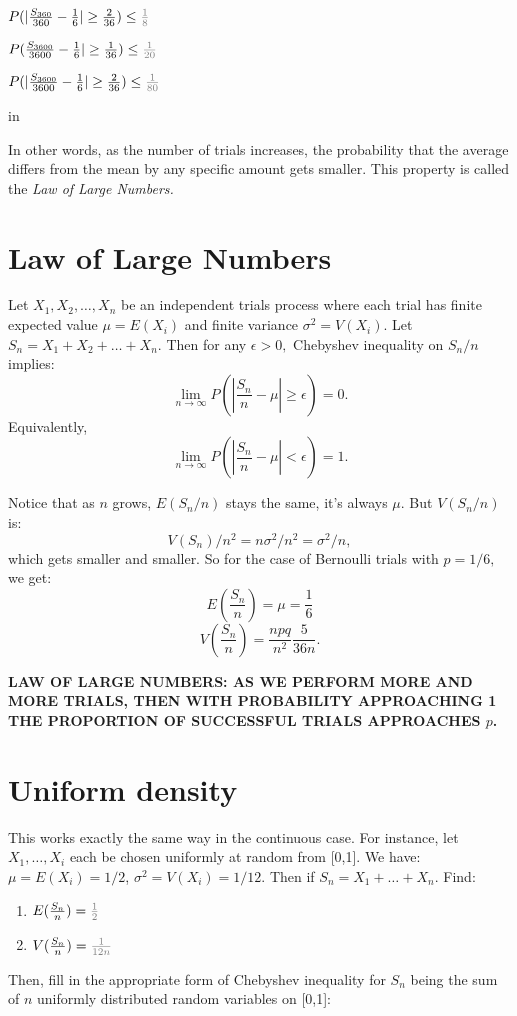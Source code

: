 \documentclass[english]{svjour3modified}
\begin{document}
$P(|\frac{S_{360}}{360}-\frac{1}{6}|\geq \frac{2}{36})\leq \textcolor{black!50}{\frac{1}{8}}$ \bigskip

$P(\frac{S_{3600}}{3600}-\frac{1}{6}|\geq \frac{1}{36})\leq \textcolor{black!50}{\frac{1}{20}}$ \bigskip

$P(|\frac{S_{3600}}{3600}-\frac{1}{6}|\geq \frac{2}{36})\leq \textcolor{black!50}{\frac{1}{80}}$

 in


\normalsize
\noindent In other words, as the number of trials increases, the probability that the average differs from the mean by any specific amount gets smaller. This property is called the \emph{Law of Large Numbers.}

\pagebreak
\section{Law of Large Numbers}

Let $X_1,X_2,\dots,X_n$ be an independent trials process where each trial has finite expected value $\mu=E(X_i)$ and finite variance $\sigma^2=V(X_i).$ Let $S_n=X_1+X_2+\dots+X_n.$ Then for any $\epsilon>0,$ Chebyshev inequality on $S_n/n$ implies: $$\lim_{n\rightarrow\infty}P(|\frac{S_n}{n}-\mu|\geq \epsilon)=0.$$ Equivalently, $$\lim_{n\rightarrow\infty}P(|\frac{S_n}{n}-\mu|< \epsilon)=1.$$

\noindent Notice that as $n$ grows, $E(S_n/n)$ stays the same, it's always $\mu.$ But $V(S_n/n)$ is: $$V(S_n)/n^2=n\sigma^2/n^2=\sigma^2/n,$$ which gets smaller and smaller. So for the case of Bernoulli trials with $p=1/6,$ we get: $$E(\frac{S_n}{n})=\mu=\frac{1}{6}$$ $$V(\frac{S_n}{n})=\frac{npq}{n^2}\frac{5}{36n}.$$\medskip

\noindent \textbf{LAW OF LARGE NUMBERS: AS WE PERFORM MORE AND MORE TRIALS, THEN WITH PROBABILITY APPROACHING 1 THE PROPORTION OF SUCCESSFUL TRIALS APPROACHES $p$.}

\section{Uniform density}

This works exactly the same way in the continuous case. For instance, let $X_1,\dots,X_i$ each be chosen uniformly at random from [0,1]. We have: $\mu=E(X_i)=1/2$, $\sigma^2=V(X_i)=1/12.$ Then if $S_n=X_1+\dots+X_n.$ Find:\vfill\large

\begin{enumerate}
\item $E(\frac{S_n}{n})=\textcolor{black!50}{\frac{1}{2}}$ \vfill

\item $V(\frac{S_n}{n})=\textcolor{black!50}{\frac{1}{12n}}$ \vfill

\end{enumerate}\normalsize
\noindent Then, fill in the appropriate form of Chebyshev inequality for $S_n$ being the sum of $n$ uniformly distributed random variables on [0,1]:\bigskip
\end{document}
